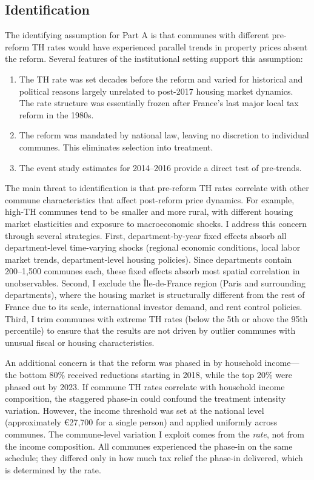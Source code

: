 \documentclass[12pt]{article}
\begin{document}
\subsection{Identification}

The identifying assumption for Part A is that communes with different pre-reform TH rates would have experienced parallel trends in property prices absent the reform. Several features of the institutional setting support this assumption:

\begin{enumerate}
\item The TH rate was set decades before the reform and varied for historical and political reasons largely unrelated to post-2017 housing market dynamics. The rate structure was essentially frozen after France's last major local tax reform in the 1980s.
\item The reform was mandated by national law, leaving no discretion to individual communes. This eliminates selection into treatment.
\item The event study estimates for 2014--2016 provide a direct test of pre-trends.
\end{enumerate}

The main threat to identification is that pre-reform TH rates correlate with other commune characteristics that affect post-reform price dynamics. For example, high-TH communes tend to be smaller and more rural, with different housing market elasticities and exposure to macroeconomic shocks. I address this concern through several strategies. First, department-by-year fixed effects absorb all department-level time-varying shocks (regional economic conditions, local labor market trends, department-level housing policies). Since departments contain 200--1,500 communes each, these fixed effects absorb most spatial correlation in unobservables. Second, I exclude the \^Ile-de-France region (Paris and surrounding departments), where the housing market is structurally different from the rest of France due to its scale, international investor demand, and rent control policies. Third, I trim communes with extreme TH rates (below the 5th or above the 95th percentile) to ensure that the results are not driven by outlier communes with unusual fiscal or housing characteristics.

An additional concern is that the reform was phased in by household income---the bottom 80\% received reductions starting in 2018, while the top 20\% were phased out by 2023. If commune TH rates correlate with household income composition, the staggered phase-in could confound the treatment intensity variation. However, the income threshold was set at the national level (approximately \euro{}27,700 for a single person) and applied uniformly across communes. The commune-level variation I exploit comes from the \emph{rate}, not from the income composition. All communes experienced the phase-in on the same schedule; they differed only in how much tax relief the phase-in delivered, which is determined by the rate.
\end{document}
